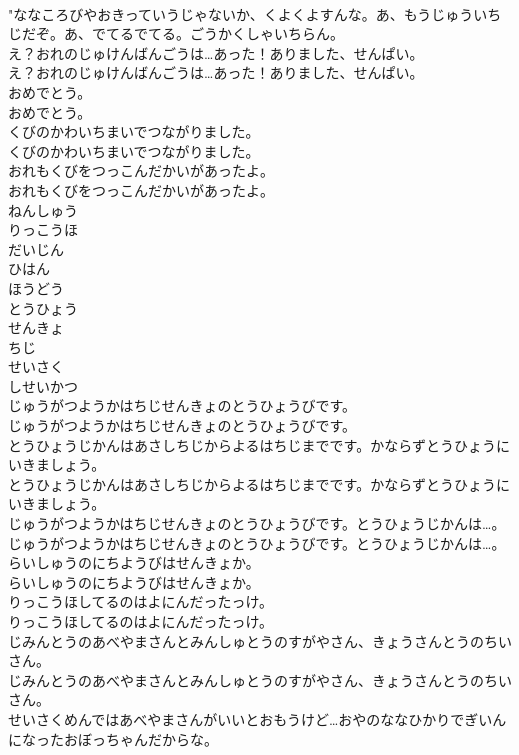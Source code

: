 \documentclass[8pt]{extreport}
\begin{document}
\begin{CJK}{UTF8}{min}
\\	"ななころびやおきっていうじゃないか、くよくよすんな。あ、もうじゅういちじだぞ。あ、でてるでてる。ごうかくしゃいちらん。 
\\	え？おれのじゅけんばんごうは…あった！ありました、せんぱい。	
\\	え？おれのじゅけんばんごうは…あった！ありました、せんぱい。 
\\	おめでとう。	
\\	おめでとう。 
\\	くびのかわいちまいでつながりました。	
\\	くびのかわいちまいでつながりました。 
\\	おれもくびをつっこんだかいがあったよ。	
\\	おれもくびをつっこんだかいがあったよ。 
\\	ねんしゅう
\\	りっこうほ
\\	だいじん
\\	ひはん
\\	ほうどう
\\	とうひょう
\\	せんきょ
\\	ちじ
\\	せいさく
\\	しせいかつ
\\	じゅうがつようかはちじせんきょのとうひょうびです。	
\\	じゅうがつようかはちじせんきょのとうひょうびです。 
\\	とうひょうじかんはあさしちじからよるはちじまでです。かならずとうひょうにいきましょう。	
\\	とうひょうじかんはあさしちじからよるはちじまでです。かならずとうひょうにいきましょう。 
\\	じゅうがつようかはちじせんきょのとうひょうびです。とうひょうじかんは…。	
\\	じゅうがつようかはちじせんきょのとうひょうびです。とうひょうじかんは…。 
\\	らいしゅうのにちようびはせんきょか。	
\\	らいしゅうのにちようびはせんきょか。 
\\	りっこうほしてるのはよにんだったっけ。	
\\	りっこうほしてるのはよにんだったっけ。 
\\	じみんとうのあべやまさんとみんしゅとうのすがやさん、きょうさんとうのちいさん。	
\\	じみんとうのあべやまさんとみんしゅとうのすがやさん、きょうさんとうのちいさん。 
\\	せいさくめんではあべやまさんがいいとおもうけど…おやのななひかりでぎいんになったおぼっちゃんだからな。	

\end{CJK}
\end{document}
